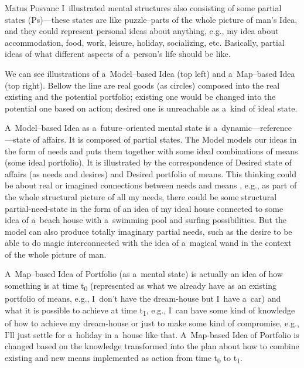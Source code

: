 \begin{artengenv}{Matus Posvanc}
I~illustrated mental structures also consisting of some partial states (Ps)---these states are like puzzle–parts of the whole picture of man's Idea, and they could represent personal ideas about anything, e.g., my idea about accommodation, food, work, leisure, holiday, socializing, etc. Basically, partial ideas of what different aspects of a~person's life should be like.



We can see illustrations of a~Model–based Idea (top left) and a~Map–based Idea (top right). Bellow the line are real goods (as circles) composed into the real existing and the potential portfolio; existing one would be changed into the potential one based on action; desired one is unreachable as a~kind of ideal state.



A~Model–based Idea as a~future–oriented mental state is a~dynamic---reference---state of affairs. It is composed of partial states. The Model models our ideas in the form of needs and puts them together with some ideal combinations of means (some ideal portfolio). It is illustrated by the correspondence of Desired state of affairs (as needs and desires) and Desired portfolio of means. This thinking could be about real or imagined connections between needs and means 
\parencite[][]{Menger2007Principles}, %
 e.g., as part of the whole structural picture of all my needs, there could be some structural partial-need-state in the form of an idea of my ideal house connected to some idea of a~beach house with a~swimming pool and surfing possibilities. But the model can also produce totally imaginary partial needs, such as the desire to be able to do magic interconnected with the idea of a~magical wand in the context of the whole picture of man.



A~Map–based Idea of Portfolio (as a~mental state) is actually an idea of how something is at time t\textsubscript{0} (represented as what we already have as an existing portfolio of means, e.g., I~don't have the dream-house but I~have a~car) and what it is possible to achieve at time t\textsubscript{1}, e.g., I~can have some kind of knowledge of how to achieve my dream-house or just to make some kind of compromise, e.g., I'll just settle for a~holiday in a~house like that. A~Map-based Idea of Portfolio is changed based on the knowledge transformed into the plan about how to combine existing and new means implemented as action from time t\textsubscript{0} to t\textsubscript{1}.




\end{artengenv}
